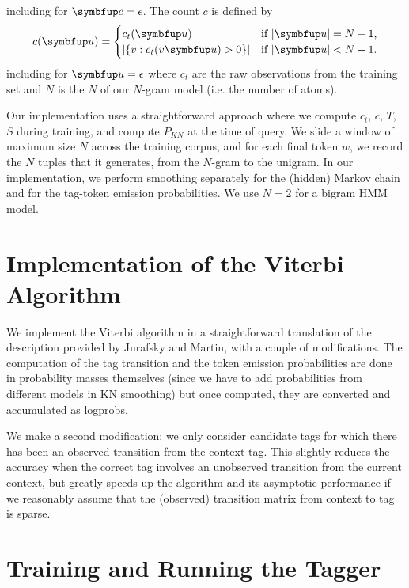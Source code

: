 \documentclass[12pt,article,oneside,onecolumn,final,a4paper]{memoir}
\theoremstyle{myplain}
\theoremstyle{nonumbermyplain}
\theoremstyle{myplain}
\theoremstyle{nonumbermyplain}
\theoremstyle{nonumberproof}
\theoremstyle{nonumbersolution}
\numberwithin{equation}{chapter}
\begin{document}
including for \(\w{c}=\epsilon\). The count \(c\) is defined by
\begin{equation*}
  c\p{\w{u}}=
  \begin{cases}
    c_t\p{\w{u}}&\text{if \(\abs{\w{u}}=N-1\),} \\
    \abs{\B{v:c_t\p{v\w{u}}>0}}&\text{if \(\abs{\w{u}}<N-1\).}
  \end{cases}
\end{equation*}
including for \(\w{u}=\epsilon\) where \(c_t\) are the raw observations from
the training set and \(N\) is the \(N\) of our \(N\)-gram model
(i.e. the number of atoms).

Our implementation uses a straightforward approach where we compute
\(c_t\), \(c\), \(T\), \(S\) during training, and compute \(P_{KN}\)
at the time of query. We slide a window of maximum size \(N\) across
the training corpus, and for each final token \(w\), we record the
\(N\) tuples that it generates, from the \(N\)-gram to the unigram. In
our implementation, we perform smoothing separately for the (hidden)
Markov chain and for the tag-token emission probabilities. We use
\(N=2\) for a bigram HMM model.

\section{Implementation of the Viterbi Algorithm}

We implement the Viterbi algorithm in a straightforward translation of
the description provided by Jurafsky and Martin, with a couple of
modifications. The computation of the tag transition and the token
emission probabilities are done in probability masses themselves
(since we have to add probabilities from different models in KN
smoothing) but once computed, they are converted and accumulated as
logprobs.

We make a second modification: we only consider candidate tags for
which there has been an observed transition from the context tag. This
slightly reduces the accuracy when the correct tag involves an
unobserved transition from the current context, but greatly speeds up
the algorithm and its asymptotic performance if we reasonably assume
that the (observed) transition matrix from context to tag is sparse.

\section{Training and Running the Tagger}
\end{document}
